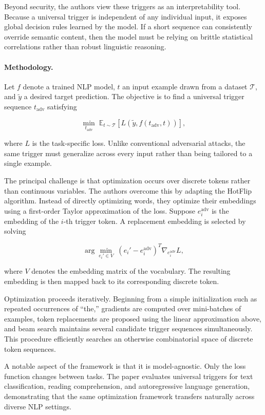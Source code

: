 \documentclass[11pt]{article}
\begin{document}
Beyond security, the authors view these triggers as an interpretability tool. Because a universal trigger is independent of any individual input, it exposes global decision rules learned by the model. If a short sequence can consistently override semantic content, then the model must be relying on brittle statistical correlations rather than robust linguistic reasoning.

\paragraph{Methodology.}

Let \(f\) denote a trained NLP model, \(t\) an input example drawn from a dataset \(\mathcal{T}\), and \(\tilde{y}\) a desired target prediction. The objective is to find a universal trigger sequence \(t_{\mathrm{adv}}\) satisfying

\[
\min_{t_{\mathrm{adv}}}
\;
\mathbb{E}_{t\sim\mathcal{T}}
\left[
L\!\left(
\tilde{y},
f(t_{\mathrm{adv}},t)
\right)
\right],
\]

where \(L\) is the task-specific loss. Unlike conventional adversarial attacks, the same trigger must generalize across every input rather than being tailored to a single example.

The principal challenge is that optimization occurs over discrete tokens rather than continuous variables. The authors overcome this by adapting the HotFlip algorithm. Instead of directly optimizing words, they optimize their embeddings using a first-order Taylor approximation of the loss. Suppose \(e_i^{\mathrm{adv}}\) is the embedding of the \(i\)-th trigger token. A replacement embedding is selected by solving

\[
\arg\min_{e_i'\in V}
\;
(e_i'-e_i^{\mathrm{adv}})^T
\nabla_{e_i^{\mathrm{adv}}}L,
\]

where \(V\) denotes the embedding matrix of the vocabulary. The resulting embedding is then mapped back to its corresponding discrete token.

Optimization proceeds iteratively. Beginning from a simple initialization such as repeated occurrences of ``the,'' gradients are computed over mini-batches of examples, token replacements are proposed using the linear approximation above, and beam search maintains several candidate trigger sequences simultaneously. This procedure efficiently searches an otherwise combinatorial space of discrete token sequences.

A notable aspect of the framework is that it is model-agnostic. Only the loss function changes between tasks. The paper evaluates universal triggers for text classification, reading comprehension, and autoregressive language generation, demonstrating that the same optimization framework transfers naturally across diverse NLP settings.
\end{document}
